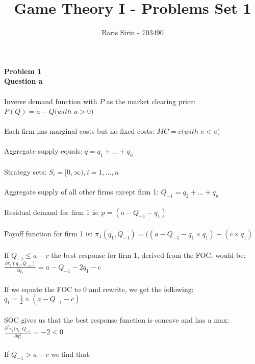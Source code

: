 \documentclass[a4paper, 12pt]{article}
\title{Game Theory I - Problems Set 1}
\author{Baris Sirin - 703490}
\begin{document}
	
\maketitle
{}
\newpage
{}
	
	\textbf{Problem 1}\\

	\textbf{Question a}\\ 
	\\
	 Inverse demand function with $ P$ as the market clearing price:\\
	 
	$P(Q)=a-Q (with$ $ a>0)$\\
	\\	
	Each firm has marginal costs but no fixed costs: $MC=c (with$ $c <a )$\\
	\\
	Aggregate supply equals: $q=q_{1}+...+q_{n}$\\
	\\
	Strategy sets: $S_{i} = [0,\infty), i=1,...,n$\\
	\\
	Aggregate supply of all other firms except firm 1: $Q_{-1}=q_{2}+...+q_{n}$\\
	\\
	Residual demand for firm 1 is: $p= (a-Q_{-1} - q_{1})$\\
	\\
	Payoff function for firm 1 is: $\pi_{1}(q_{1}, Q_{-1})=((a-Q_{-1}-q_{1}\times q_{1})-(c\times q_{1})$\\
	\\
	If $Q_{-1} \leq a-c$ the best response for firm 1, derived from the FOC, would be:\\
	
	$\frac {\partial \pi_{i} (q_{1}, Q_{-1})} {\partial q_{1}}=a-Q_{-1}-2q_{1}-c$\\
	\\
	If we equate the FOC to 0 and rewrite, we get the following: \\
	
	$q_{1}=\frac{1}{2}\times(a-Q_{-1}-c)$\\
	\\
	SOC gives us that the best response function is concave and has a max: \\
	
	$\frac{\partial^2\pi_{i}(q_{1}, Q_{-1}}{\partial q_{1}^2}=-2<0$\\
	\\
	If $Q_{-1}>a-c$ we find that: \\
	
\end{document}
